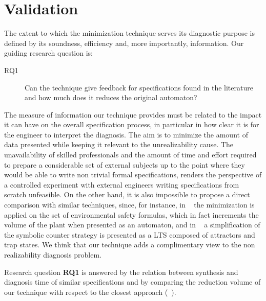 \section{Validation}\label{sec:validation}
The extent to which the minimization technique serves its diagnostic purpose is defined by its soundness, efficiency and, more importantly, information. 
Our guiding research question is:
\begin{description}
	\item[RQ1] Can the technique give feedback for specifications found in the literature and how much does it reduces the original automaton?
\end{description}



The measure of information our technique provides must be related to the impact it can have on the overall specification process, in particular in how clear it is for the engineer  to interpret the diagnosis. The aim is to minimize the amount of data presented while keeping it relevant to the unrealizability cause. The unavailability of skilled professionals and the amount of time and effort required to prepare a considerable set of external subjects up to the point where they would be able to write non trivial formal specifications, renders the perspective of a controlled experiment with external engineers writing specifications from scratch unfeasible. On the other hand, it is also impossible to propose a direct comparison with similar techniques, since, for instance, in ~\cite{DBLP:conf/hvc/KonighoferHB10} the minimization is applied on the set of environmental safety formulas, which in fact increments the volume of the plant when presented as an automaton, and in ~\cite{DBLP:conf/sigsoft/KuventMR17} a simplification of the symbolic counter strategy is presented as a LTS composed of attractors and trap states. We think that our technique adds a complimentary view to the non realizability diagnosis problem.

Research question \textbf{RQ1} is answered by the relation between synthesis and diagnosis time of similar specifications and by comparing the reduction volume of our technique with respect to the closest approach (~\cite{DBLP:conf/hvc/KonighoferHB10}). 

